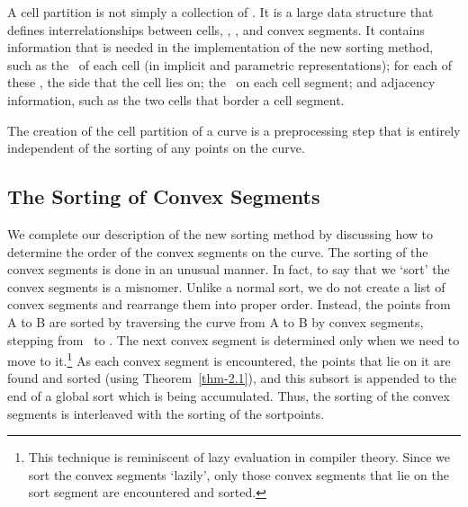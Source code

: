 %

A cell partition is not simply a collection of \walls.
It is a large data structure that defines interrelationships
between cells, \walls, \wallpoints, and convex segments.
It contains information that is needed in the implementation of the
new sorting method, such as the \walls\ of each cell (in implicit and
parametric representations);  for each of these \walls, the side that the cell
lies on; the \wallpoints\ on each cell segment;
and adjacency information, such as the two cells that border a cell segment.

The creation of the cell partition of a curve is a preprocessing step that
is entirely independent of the sorting of any points on the curve.
%
\subsection{The Sorting of Convex Segments}
We complete our description of the new sorting method
by discussing
how to determine the order of the convex segments on the curve.
The sorting of the convex segments is done in an unusual manner.
In fact, to say that we `sort' the convex segments is a misnomer.
Unlike a normal sort, we do not create a list of convex segments and 
rearrange them into proper order.
Instead, the points from A to B are sorted by traversing the curve from A to
B by convex segments, stepping from \wallpoint\ to \wallpoint.
The next convex segment is determined only when we
need to move to it.\footnote{This technique is reminiscent of lazy evaluation
in compiler theory.
Since we sort the convex segments `lazily',
only those convex segments that lie on the sort segment
are encountered and sorted.}
As each convex segment is encountered, the points that lie on it are found
and sorted (using Theorem~\ref{thm-2.1}), and this subsort is appended to the
end of a global sort which is being accumulated.
Thus, the sorting of the convex segments is interleaved with the sorting
of the sortpoints.

